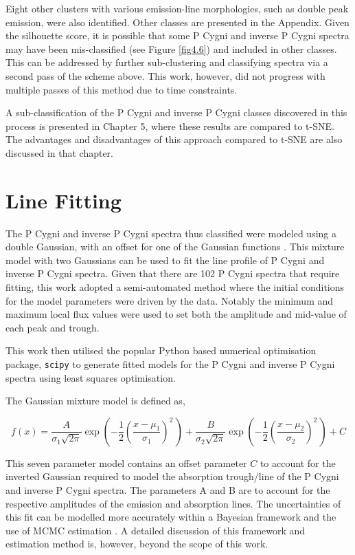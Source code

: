 Eight other clusters with various emission-line morphologies, such as double peak emission, were also identified. Other classes are presented in the Appendix. Given the silhouette score, it is possible that some P Cygni and inverse P Cygni spectra may have been mis-classified (see Figure \ref{fig4.6}) and included in other classes. This can be addressed by further sub-clustering and classifying spectra via a second pass of the scheme above. This work, however, did not progress with multiple passes of this method due to time constraints. 

A sub-classification of the P Cygni and inverse P Cygni classes discovered in this process is presented in Chapter 5, where these results are compared to t-SNE. The advantages and disadvantages of this approach compared to t-SNE are also discussed in that chapter. 

\section{Line Fitting}

The P Cygni and inverse P Cygni spectra thus classified were modeled using a double Gaussian, with an offset for one of the Gaussian functions \citep{traven2015gaia, zhang2021catalog}. This mixture model with two Gaussians can be used to fit the line profile of P Cygni and inverse P Cygni spectra. Given that there are 102 P Cygni spectra that require fitting, this work adopted a semi-automated method where the initial conditions for the model parameters were driven by the data. Notably the minimum and maximum local flux values were used to set both the amplitude and mid-value of each peak and trough.

This work then utilised the popular Python based numerical optimisation package, \texttt{scipy} \citep{2020SciPy-NMeth} to generate fitted models for the P Cygni and inverse P Cygni spectra using least squares optimisation.

The Gaussian mixture model is defined as, 

\begin{equation}
    f(x) = \frac{A}{\sigma_1\sqrt{2\pi}} 
  \exp\left( -\frac{1}{2}\left(\frac{x-\mu_1}{\sigma_1}\right)^{\!2}\,\right) + \frac{B}{\sigma_2\sqrt{2\pi}} 
  \exp\left( -\frac{1}{2}\left(\frac{x-\mu_2}{\sigma_2}\right)^{\!2}\,\right) + C
\end{equation}


This seven parameter model contains an offset parameter $C$ to account for the inverted Gaussian required to model the absorption trough/line of the P Cygni and inverse P Cygni spectra. The parameters A and B are to account for the respective amplitudes of the emission and absorption lines. The uncertainties of this fit can be modelled more accurately within a Bayesian framework and the use of MCMC estimation \citep{hogg2010data}. A detailed discussion of this framework and estimation method is, however, beyond the scope of this work.

